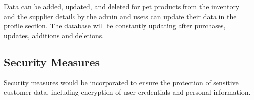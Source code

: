 \documentclass{article}
\begin{document}
Data can be added, updated, and deleted for pet products from the inventory and the supplier details by the admin and users can update their data in the profile section. The database will be constantly updating after purchases, updates, additions and deletions.

\subsection{Security Measures}

Security measures would be incorporated to ensure the protection of sensitive customer data, including encryption of user credentials and personal information. 
\end{document}
